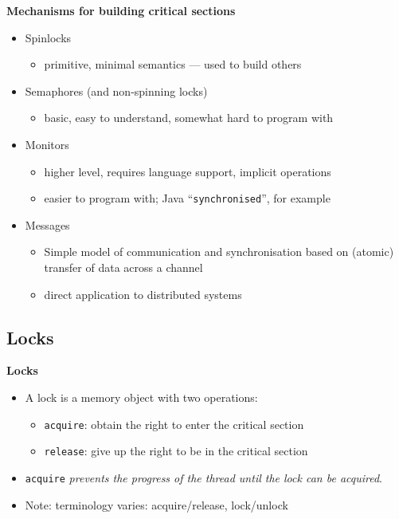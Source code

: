 \documentclass[11pt,a4paper]{article}
\begin{document}
\textbf{Mechanisms for building critical sections}
\begin{itemize}
    \item Spinlocks
        \begin{itemize}
            \item primitive, minimal semantics --- used to build others
        \end{itemize}
    \item Semaphores (and non-spinning locks)
        \begin{itemize}
            \item basic, easy to understand, somewhat hard to program with
        \end{itemize}
    \item Monitors
        \begin{itemize}
            \item higher level, requires language support, implicit operations
            \item easier to program with; Java ``\texttt{synchronised}'', for example
        \end{itemize}
    \item Messages
        \begin{itemize}
            \item Simple model of communication and synchronisation based on (atomic)
                transfer of data across a channel
            \item direct application to distributed systems
        \end{itemize}
\end{itemize}

\subsection{Locks}

\textbf{Locks}
\begin{itemize}
    \item A lock is a memory object with two operations:
        \begin{itemize}
            \item \texttt{acquire}: obtain the right to enter the critical section
            \item \texttt{release}: give up the right to be in the critical section
        \end{itemize}
    \item \texttt{acquire} \emph{prevents the progress of the thread until the lock
        can be acquired}.
    \item Note: terminology varies: acquire/release, lock/unlock
\end{itemize}
\end{document}

